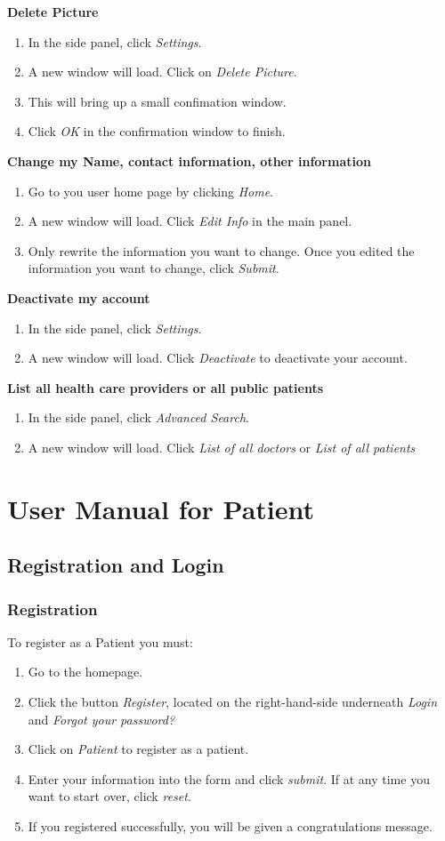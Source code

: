 \textbf{Delete Picture}
\begin{enumerate}
\item In the side panel, click \textit{Settings}.
\item A new window will load. Click on \textit{Delete Picture}.
\item This will bring up a small confimation window.
\item Click \textit{OK} in the confirmation window to finish.
\end{enumerate}
\textbf{Change my Name, contact information, other information}
\begin{enumerate}
\item Go to you user home page by clicking \textit{Home}.
\item A new window will load. Click \textit{Edit Info} in the main panel.
\item Only rewrite the information you want to change. Once you edited the information you want to change, click \textit{Submit}.
\end{enumerate}
\textbf{Deactivate my account}
\begin{enumerate}
\item In the side panel, click \textit{Settings}.
\item A new window will load. Click \textit{Deactivate} to deactivate your account.
\end{enumerate}
\textbf{List all health care providers or all public patients}
\begin{enumerate}
\item In the side panel, click \textit{Advanced Search}.
\item A new window will load. Click \textit{List of all doctors} or \textit{List of all patients}
\end{enumerate}

\chapter{User Manual for Patient}
\section{Registration and Login}
\subsection{Registration}
To register as a Patient you must:
\begin{enumerate}
\item Go to the homepage.
\item Click the button \textit{Register}, located on the right-hand-side underneath \textit{Login} and \textit{Forgot your password?}
\item Click on \textit{Patient} to register as a patient.
\item Enter your information into the form and click \textit{submit}. If at any time you want to start over, click \textit{reset}.
\item If you registered successfully, you will be given a congratulations message.
\end{enumerate}

